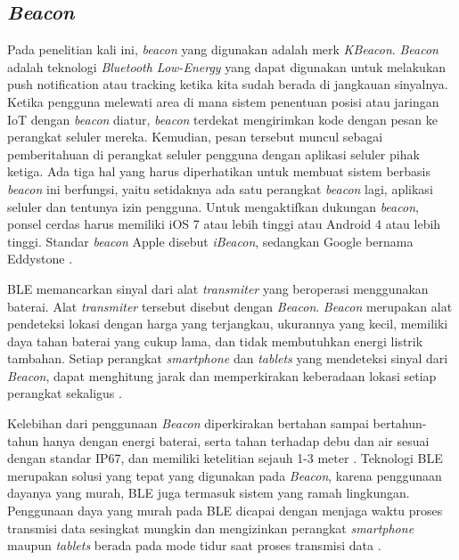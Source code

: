 \subsection{\textit{Beacon}}
\par Pada penelitian kali ini, \textit{beacon} yang digunakan adalah merk \textit{KBeacon}. \textit{Beacon} adalah teknologi \textit{Bluetooth Low-Energy} yang dapat digunakan untuk melakukan push notification atau tracking ketika kita sudah berada di jangkauan sinyalnya. Ketika pengguna melewati area di mana sistem penentuan posisi atau jaringan IoT dengan \textit{beacon} diatur, \textit{beacon} terdekat mengirimkan kode dengan pesan ke perangkat seluler mereka. Kemudian, pesan tersebut muncul sebagai pemberitahuan di perangkat seluler pengguna dengan aplikasi seluler pihak ketiga. Ada tiga hal yang harus diperhatikan untuk membuat sistem berbasis \textit{beacon} ini berfungsi, yaitu setidaknya ada satu perangkat \textit{beacon} lagi, aplikasi seluler dan tentunya izin pengguna. Untuk mengaktifkan dukungan \textit{beacon}, ponsel cerdas harus memiliki iOS 7 atau lebih tinggi atau Android 4 atau lebih tinggi. Standar \textit{beacon} Apple disebut \textit{iBeacon}, sedangkan Google bernama Eddystone \citep{Kim2014}.

\par BLE memancarkan sinyal dari alat \textit{transmiter} yang beroperasi menggunakan baterai. Alat \textit{transmiter} tersebut disebut dengan \textit{Beacon}. \textit{Beacon} merupakan alat pendeteksi lokasi dengan harga yang terjangkau, ukurannya yang kecil, memiliki daya tahan baterai yang cukup lama, dan tidak membutuhkan energi listrik tambahan. Setiap perangkat \textit{smartphone} dan \textit{tablets} yang mendeteksi sinyal dari \textit{Beacon}, dapat menghitung jarak dan memperkirakan keberadaan lokasi setiap perangkat sekaligus \citep{Keluza2017}.

\par Kelebihan dari penggunaan \textit{Beacon} diperkirakan bertahan sampai bertahun-tahun hanya dengan energi baterai, serta tahan terhadap debu dan air sesuai dengan standar IP67, dan memiliki ketelitian sejauh 1-3 meter \citep{Insoft2016}. Teknologi BLE merupakan solusi yang tepat yang digunakan pada \textit{Beacon}, karena penggunaan dayanya yang murah, BLE juga termasuk sistem yang ramah lingkungan. Penggunaan daya yang murah pada BLE dicapai dengan menjaga waktu proses transmisi data sesingkat mungkin dan mengizinkan perangkat \textit{smartphone} maupun \textit{tablets} berada pada mode tidur saat proses transmisi data \citep{Feng2011}.




